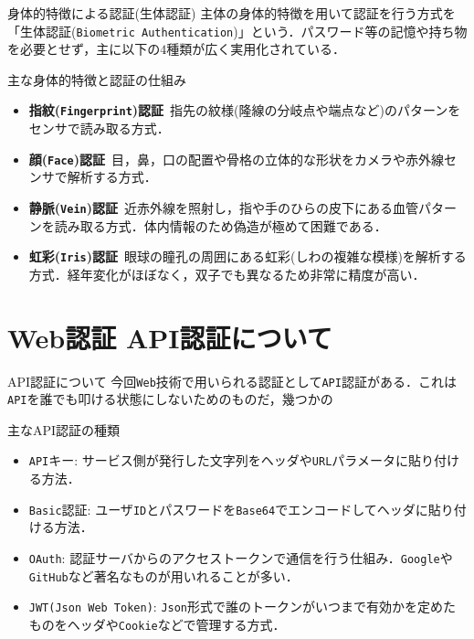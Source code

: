 \documentclass[11pt, aspectratio=169]{beamer}
\begin{document}
\begin{frame}{身体的特徴による認証(生体認証)}
  主体の身体的特徴を用いて認証を行う方式を「生体認証(\texttt{Biometric Authentication})」という．パスワード等の記憶や持ち物を必要とせず，主に以下の$4$種類が広く実用化されている．

  \begin{block}{主な身体的特徴と認証の仕組み}
    \begin{itemize}
      \item \textbf{指紋(\texttt{Fingerprint})認証}\
      指先の紋様(隆線の分岐点や端点など)のパターンをセンサで読み取る方式．
      \item \textbf{顔(\texttt{Face})認証}\
      目，鼻，口の配置や骨格の立体的な形状をカメラや赤外線センサで解析する方式．
      \item \textbf{静脈(\texttt{Vein})認証}\
      近赤外線を照射し，指や手のひらの皮下にある血管パターンを読み取る方式．体内情報のため偽造が極めて困難である．
      \item \textbf{虹彩(\texttt{Iris})認証}\
      眼球の瞳孔の周囲にある虹彩(しわの複雑な模様)を解析する方式．経年変化がほぼなく，双子でも異なるため非常に精度が高い．
    \end{itemize}
  \end{block}
\end{frame}

\section{Web認証 API認証について}

\begin{frame}{API認証について}
  今回\texttt{Web}技術で用いられる認証として\texttt{API}認証がある．これは\texttt{API}を誰でも叩ける状態にしないためのものだ，幾つかの
  \begin{block}{主なAPI認証の種類}
    \begin{itemize}
      \item \texttt{API}キー: サービス側が発行した文字列をヘッダや\texttt{URL}パラメータに貼り付ける方法．
      \item \texttt{Basic}認証: ユーザ\texttt{ID}とパスワードを\texttt{Base64}でエンコードしてヘッダに貼り付ける方法．
      \item \texttt{OAuth}: 認証サーバからのアクセストークンで通信を行う仕組み．\texttt{Google}や\texttt{GitHub}など著名なものが用いれることが多い．
      \item \texttt{JWT(Json Web Token)}: \texttt{Json}形式で誰のトークンがいつまで有効かを定めたものをヘッダや\texttt{Cookie}などで管理する方式．
    \end{itemize}
  \end{block}
\end{frame}
\end{document}
